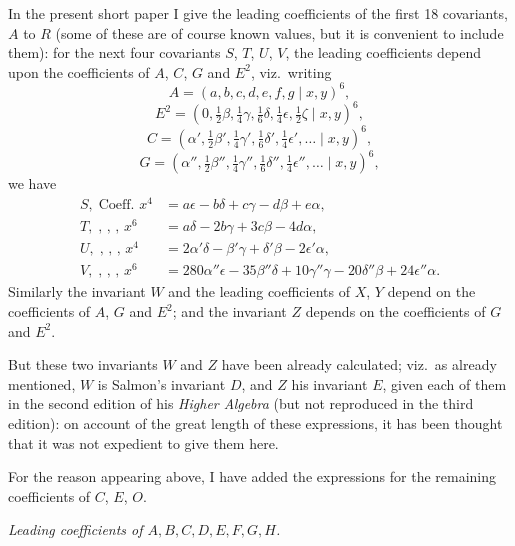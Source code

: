 \documentclass[11pt,a4paper]{article}
\begin{document}
\medskip
In the present short paper I give the leading coefficients of the first
18 covariants, $A$ to $R$ (some of these are of course known values, but
it is convenient to include them): for the next four covariants $S$,
$T$, $U$, $V$, the leading coefficients depend upon the coefficients of
$A$, $C$, $G$ and $E^{2}$, viz.\ writing
\[
  A = (a,b,c,d,e,f,g\mid x,y)^{6},
\]
\[
  E^{2} = (0,\tfrac{1}{2}\beta,\tfrac{1}{4}\gamma,\tfrac{1}{6}\delta,\tfrac{1}{4}\epsilon,\tfrac{1}{2}\zeta\mid x,y)^{6},
\]
\[
  C = (\alpha',\tfrac{1}{2}\beta',\tfrac{1}{4}\gamma',\tfrac{1}{6}\delta',\tfrac{1}{4}\epsilon',\ldots\mid x,y)^{6},
\]
\[
  G = (\alpha'',\tfrac{1}{2}\beta'',\tfrac{1}{4}\gamma'',\tfrac{1}{6}\delta'',\tfrac{1}{4}\epsilon'',\ldots\mid x,y)^{6},
\]
we have
\begin{align*}
  S,\;\text{Coeff.\ }x^{4} &= a\epsilon-b\delta+c\gamma-d\beta+e\alpha,\\
  T,\;\text{,\ ,\ ,\ } x^{6} &= a\delta-2b\gamma+3c\beta-4d\alpha,\\
  U,\;\text{,\ ,\ ,\ } x^{4} &= 2\alpha'\delta-\beta'\gamma+\delta'\beta-2\epsilon'\alpha,\\
  V,\;\text{,\ ,\ ,\ } x^{6} &= 280\alpha''\epsilon-35\beta''\delta+10\gamma''\gamma-20\delta''\beta+24\epsilon''\alpha.
\end{align*}
Similarly the invariant $W$ and the leading coefficients of $X$, $Y$
depend on the coefficients of $A$, $G$ and $E^{2}$; and the invariant
$Z$ depends on the coefficients of $G$ and $E^{2}$.

\newpage
\noindent
But these two invariants $W$ and $Z$ have been already calculated; viz.\
as already mentioned, $W$ is Salmon's invariant $D$, and $Z$ his
invariant $E$, given each of them in the second edition of his
\textit{Higher Algebra} (but not reproduced in the third edition): on
account of the great length of these expressions, it has been thought
that it was not expedient to give them here.

For the reason appearing above, I have added the expressions for the
remaining coefficients of $C$, $E$, $O$.

\medskip
\begin{center}
\textit{Leading coefficients of $A,B,C,D,E,F,G,H$.}
\end{center}
\end{document}
